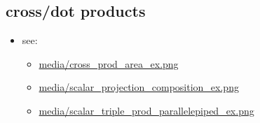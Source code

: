 \documentclass[11pt]{article}
\theoremstyle{definition}
\begin{document}
\subsection*{cross/dot products}
\begin{itemize}
  \item see:
  \begin{itemize}
    \item \url{media/cross_prod_area_ex.png}
    \item \url{media/scalar_projection_composition_ex.png}
    \item \url{media/scalar_triple_prod_parallelepiped_ex.png}
  \end{itemize}
\end{itemize}






\end{document}
